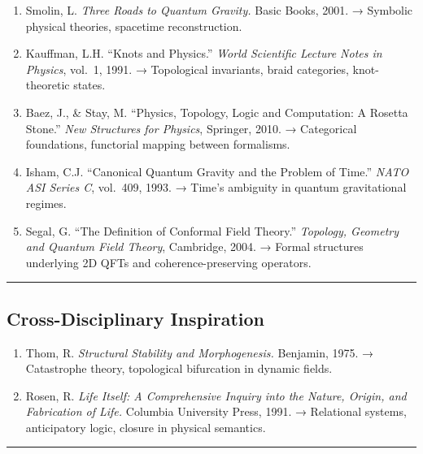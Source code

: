 \documentclass[
  11pt,
]{article}
\begin{document}
\begin{enumerate}
\def\labelenumi{\arabic{enumi}.}
\setcounter{enumi}{3}
\item
  Smolin, L. \emph{Three Roads to Quantum Gravity.} Basic Books, 2001. →
  Symbolic physical theories, spacetime reconstruction.
\item
  Kauffman, L.H. ``Knots and Physics.'' \emph{World Scientific Lecture
  Notes in Physics}, vol.~1, 1991. → Topological invariants, braid
  categories, knot-theoretic states.
\item
  Baez, J., \& Stay, M. ``Physics, Topology, Logic and Computation: A
  Rosetta Stone.'' \emph{New Structures for Physics}, Springer, 2010. →
  Categorical foundations, functorial mapping between formalisms.
\item
  Isham, C.J. ``Canonical Quantum Gravity and the Problem of Time.''
  \emph{NATO ASI Series C}, vol.~409, 1993. → Time's ambiguity in
  quantum gravitational regimes.
\item
  Segal, G. ``The Definition of Conformal Field Theory.''
  \emph{Topology, Geometry and Quantum Field Theory}, Cambridge, 2004. →
  Formal structures underlying 2D QFTs and coherence-preserving
  operators.
\end{enumerate}

\begin{center}\rule{0.5\linewidth}{0.5pt}\end{center}

\subsection{\texorpdfstring{\textbf{Cross-Disciplinary
Inspiration}}{Cross-Disciplinary Inspiration}}\label{cross-disciplinary-inspiration}

\begin{enumerate}
\def\labelenumi{\arabic{enumi}.}
\setcounter{enumi}{8}
\item
  Thom, R. \emph{Structural Stability and Morphogenesis.} Benjamin,
  1975. → Catastrophe theory, topological bifurcation in dynamic fields.
\item
  Rosen, R. \emph{Life Itself: A Comprehensive Inquiry into the Nature,
  Origin, and Fabrication of Life.} Columbia University Press, 1991. →
  Relational systems, anticipatory logic, closure in physical semantics.
\end{enumerate}

\begin{center}\rule{0.5\linewidth}{0.5pt}\end{center}
\end{document}
